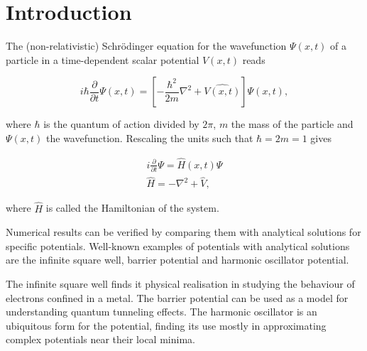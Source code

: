\section{Introduction}
The (non-relativistic) Schr\"{o}dinger equation for the wavefunction $\Psi(x,t)$ of a particle in a time-dependent scalar potential $V(x,t)$ reads 

\[
i\hbar \frac{\partial}{\partial t}\Psi(x,t) = \left[-\frac{\hbar^2}{2m}\nabla^2+\hat{V(x,t)}\right]\Psi(x,t),
\]

where $\hbar$ is the quantum of action divided by $2\pi$, $m$ the mass of the particle and $\Psi(x,t)$ the wavefunction.
Rescaling the units such that $\hbar = 2m = 1$ gives

\begin{gather*}
i \frac{\partial}{\partial t}\Psi = \hat{H}(x,t)\Psi\\
\hat{H} = -\nabla^2+\hat{V},
\end{gather*}

where $\hat{H}$ is called the Hamiltonian of the system.

Numerical results can be verified by comparing them with analytical solutions for specific potentials. Well-known examples of potentials with analytical solutions are the infinite square well, barrier potential and harmonic oscillator potential.

The infinite square well finds it physical realisation in studying the behaviour of electrons confined in a metal. The barrier potential can be used as a model for understanding quantum tunneling effects. The harmonic oscillator is an ubiquitous form for the potential, finding its use mostly in approximating complex potentials near their local minima.


